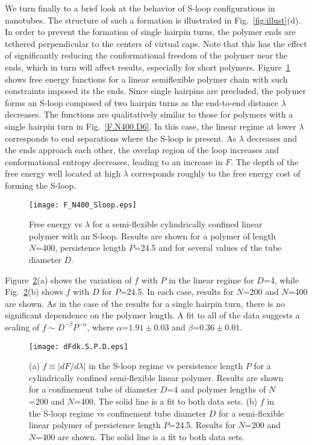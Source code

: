 \documentclass[journal=mamobx,manuscript=article,layout=twocolumn]{achemso}
\begin{document}
We turn finally to a brief look at the behavior of S-loop configurations in nanotubes.
The structure of such a formation is illustrated in Fig.~\ref{fig:illust}(d).
In order to prevent the formation of single hairpin turns, the polymer ends are
tethered perpendicular to the centers of virtual caps. Note that this has the effect
of significantly reducing the conformational freedom of the polymer near the ends,
which in turn will affect results, especially for short polymers.
Figure~\ref{F_N400_Sloop} shows free energy functions for a linear semiflexible
polymer chain with such constraints imposed its the ends. Since single hairpins are 
precluded, the polymer forms an S-loop composed of two hairpin turns as the end-to-end 
distance $\lambda$ decreases. The functions
are qualitatively similar to those for polymers with a single hairpin turn in
Fig.~\ref{F.N400.D6}. In this case, the linear regime at lower $\lambda$ 
corresponds to end separations where the S-loop is present. As $\lambda$
decreases and the ends approach each other, the overlap region of the loop
increases and conformational entropy decreases, leading to an increase in $F$.
The depth of the free energy well located at high $\lambda$ corresponds roughly to the
free energy cost of forming the S-loop.

\begin{figure}[!ht]
\begin{center}
\texttt{[image: F\_N400\_Sloop.eps]}
\end{center}
\caption{
Free energy vs $\lambda$ for a semi-flexible cylindrically confined linear polymer 
with an S-loop. Results are shown for a polymer of length $N$=400,  
persistence length $P$=24.5 and for several values of the tube diameter $D$. }
\label{F_N400_Sloop}
\end{figure}

Figure~\ref{dFdkappa.P.R2.5}(a) shows the variation of $f$ with $P$ 
in the linear regime for $D$=4, while Fig.~\ref{dFdkappa.P.R2.5}(b) shows $f$ 
with $D$ for $P$=24.5. In each case, results for $N$=200 and $N$=400 are shown.
As in the case of the results for a single hairpin turn, there is no significant
dependence on the polymer length.
A fit to all of the data suggests a scaling of $f \sim D^{-\beta} P^{-\alpha}$,
where $\alpha$=$1.91\pm 0.03$  and $\beta$=$0.36\pm 0.01$. 

\begin{figure}[!ht]
\begin{center}
\vskip 0.1in
\texttt{[image: dFdk.S.P.D.eps]}
\end{center}
\caption{
(a) $f\equiv |dF/d\lambda|$ in the S-loop regime vs persistence length $P$ for a 
cylindrically confined semi-flexible linear polymer. Results are shown for a confinement
tube of diameter $D$=4 and polymer lengths of $N$=200 and $N$=400. The solid line is a fit
to both data sets.
(b) $f$ in the S-loop regime vs confinement tube diameter $D$ for a
semi-flexible linear polymer of persistence length $P$=24.5. Results for
$N$=200 and $N$=400 are shown. The solid line is a fit to both data sets.}
\label{dFdkappa.P.R2.5}
\end{figure}
\end{document}
